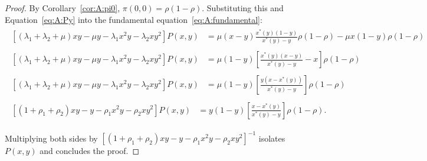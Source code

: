 \begin{proof}
    By Corollary~\ref{cor:A:pi0}, $\pi(0,0)=\rho(1-\rho)$. Substituting this and
    Equation~\eqref{eq:A:Py} into the fundamental equation~\eqref{eq:A:fundamental}:
    \begin{align*}
        \begin{split}
            \left[ (\lambda_1+\lambda_2+ \mu)xy - \mu y - \lambda_1 x^2y - \lambda_2 xy^2 \right] P(x,y)
            &= \mu(x-y) \frac{x^*(y)(1-y)}{x^*(y) - y} \rho(1-\rho)  - \mu x(1-y) \rho(1-\rho)
        \end{split} \\
        \begin{split}
            \left[ (\lambda_1+\lambda_2+\mu)xy -\mu y-\lambda_1 x^2y - \lambda_2 xy^2 \right] P(x,y)
            &= \mu (1-y) \left[ \frac{x^*(y)(x-y)}{x^*(y)-y} - x \right] \rho (1-\rho)
        \end{split} \\
        \begin{split}
            \left[ (\lambda_1+\lambda_2+\mu)xy -\mu y-\lambda_1 x^2y - \lambda_2 xy^2 \right] P(x,y)
            &= \mu  (1-y) \left[ \frac{y(x - x^*(y))}{x^*(y) - y} \right] \rho (1-\rho)
        \end{split} \\
        \begin{split}
            \left[ (1 + \rho_1 + \rho_2)xy - y-\rho_1 x^2y - \rho_2 xy^2 \right] P(x,y)
            &= y (1-y) \left[ \frac{x - x^*(y)}{x^*(y) - y} \right] \rho (1-\rho).
        \end{split}
    \end{align*}

    Multiplying both sides by $\left[(1 + \rho_1 + \rho_2)xy - y-\rho_1 x^2y - \rho_2 xy^2\right]^{-1}$
    isolates $P(x,y)$ and concludes the proof.
\end{proof}


